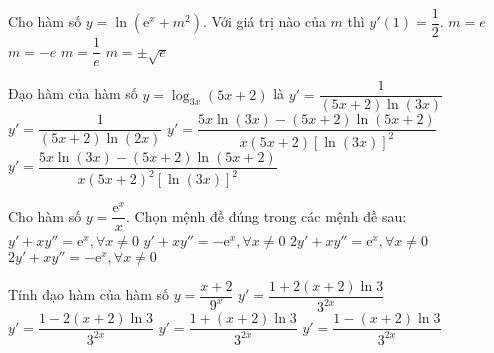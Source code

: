 \begin{ex}%
	Cho hàm số $y=\ln\left(\mathrm{e}^x+m^2\right)$. Với giá trị nào của $m$ thì $y'(1)=\dfrac{1}{2}$. 
	\choice
	{$m=e$}
	{$m=-e$}
	{$m=\dfrac{1}{e}$}
	{\True $m=\pm\sqrt{e}$}
\end{ex}
\begin{ex}%
	Đạo hàm của hàm số $y=\log_{3x}(5x+2)$ là
	\choice
	{$y'=\dfrac{1}{(5x+2)\ln(3x)}$}
	{$y'=\dfrac{1}{(5x+2)\ln(2x)}$}
	{\True $y'=\dfrac{5x\ln(3x)-(5x+2)\ln(5x+2)}{x(5x+2)[\ln(3x)]^2}$}
	{$y'=\dfrac{5x\ln(3x)-(5x+2)\ln(5x+2)}{x(5x+2)^2[\ln(3x)]^2}$}
\end{ex}
\begin{ex}%
	Cho hàm số $y=\dfrac{\mathrm{e}^x}{x}$. Chọn mệnh đề đúng trong các mệnh đề sau: 
	\choice
	{$y'+xy''=\mathrm{e}^x,\forall x\neq 0$}
	{$y'+xy''=-\mathrm{e}^x,\forall x\neq 0$}
	{\True $2y'+xy''=\mathrm{e}^x,\forall x\neq 0$}
	{$2y'+xy''=-\mathrm{e}^x,\forall x\neq 0$}
\end{ex}
\begin{ex}%
	Tính đạo hàm của hàm số $y=\dfrac{x+2}{9^x}$ 
	\choice
	{$y'=\dfrac{1+2(x+2)\ln 3}{3^{2x}}$}
	{\True $y'=\dfrac{1-2(x+2)\ln 3}{3^{2x}}$}
	{$y'=\dfrac{1+(x+2)\ln 3}{3^{2x}}$}
	{$y'=\dfrac{1-(x+2)\ln 3}{3^{2x}}$}
\end{ex}
